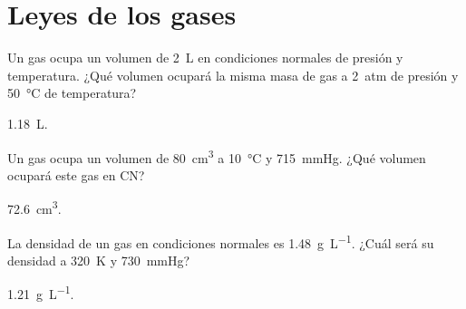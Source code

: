 \documentclass[10pt,a5paper,twoside]{article}
\begin{document}
  \begin{solution}
  \end{solution}




\section{Leyes de los gases}

  \begin{exercise}[
      tags    = {termodinámica, entalpía, entalpia de reacción, calor},
      topics  = {química, termoquímica, termodinámica},
      source  = {FQ 1B OXF 2015, p60, e46},
    ]
    Un gas ocupa un volumen de \SI{2}{\liter} en condiciones normales de presión y temperatura. ¿Qué volumen ocupará la misma masa de gas a \SI{2}{atm} de presión y \SI{50}{\celsius} de temperatura?
  \end{exercise}

  \begin{solution}
    \SI{1.18}{\liter}.
  \end{solution}




  \begin{exercise}[
      tags    = {termodinámica, entalpía, entalpia de reacción, calor},
      topics  = {química, termoquímica, termodinámica},
      source  = {FQ 1B OXF 2015, p60, e16},
    ]
    Un gas ocupa un volumen de \SI{80}{\cubic\centi\meter} a \SI{10}{\celsius} y \SI{715}{\mmHg}. ¿Qué volumen ocupará este gas en CN?
  \end{exercise}

  \begin{solution}
    \SI{72.6}{\cubic\centi\meter}.
  \end{solution}




  \begin{exercise}[
      tags    = {termodinámica, entalpía, entalpia de reacción, calor},
      topics  = {química, termoquímica, termodinámica},
      source  = {FQ 1B OXF 2015, p60, e19},
    ]
    La densidad de un gas en condiciones normales es \SI{1.48}{\gram\per\liter}. ¿Cuál será su densidad a \SI{320}{\kelvin} y \SI{730}{\mmHg}?
  \end{exercise}

  \begin{solution}
    \SI{1.21}{\gram\per\liter}.
  \end{solution}
\end{document}
